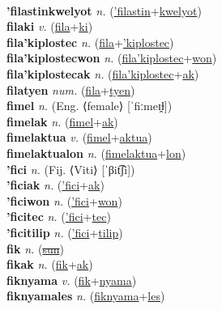  \label{'filastinwon} \\
\textbf{'filastinkwelyot} \textit{n.} (\hyperref['filastin]{'filastin}+\hyperref[kwelyot]{kwelyot})
 \label{'filastinkwelyot} \\
\textbf{filaki} \textit{v.} (\hyperref[fila]{fila}+\hyperref[ki]{ki})
 \label{filaki} \\
\textbf{fila'kiplostec} \textit{n.} (\hyperref[fila]{fila}+\hyperref['kiplostec]{'kiplostec})
 \label{fila'kiplostec} \\
\textbf{fila'kiplostecwon} \textit{n.} (\hyperref[fila'kiplostec]{fila'kiplostec}+\hyperref[won]{won})
 \label{fila'kiplostecwon} \\
\textbf{fila'kiplostecak} \textit{n.} (\hyperref[fila'kiplostec]{fila'kiplostec}+\hyperref[ak]{ak})
 \label{fila'kiplostecak} \\
\textbf{filatyen} \textit{num.} (\hyperref[fila]{fila}+\hyperref[tyen]{tyen})
 \label{filatyen} \\
\textbf{fimel} \textit{n.} (Eng. ⟨female⟩ [ˈfiːmeɪ̯ɫ])
 \label{fimel} \\
\textbf{fimelak} \textit{n.} (\hyperref[fimel]{fimel}+\hyperref[ak]{ak})
 \label{fimelak} \\
\textbf{fimelaktua} \textit{v.} (\hyperref[fimel]{fimel}+\hyperref[aktua]{aktua})
 \label{fimelaktua} \\
\textbf{fimelaktualon} \textit{n.} (\hyperref[fimelaktua]{fimelaktua}+\hyperref[lon]{lon})
 \label{fimelaktualon} \\
\textbf{'fici} \textit{n.} (Fij. ⟨Viti⟩ [ˈβit͡ʃi])
 \label{'fici} \\
\textbf{'ficiak} \textit{n.} (\hyperref['fici]{'fici}+\hyperref[ak]{ak})
 \label{'ficiak} \\
\textbf{'ficiwon} \textit{n.} (\hyperref['fici]{'fici}+\hyperref[won]{won})
 \label{'ficiwon} \\
\textbf{'ficitec} \textit{n.} (\hyperref['fici]{'fici}+\hyperref[tec]{tec})
 \label{'ficitec} \\
\textbf{'ficitilip} \textit{n.} (\hyperref['fici]{'fici}+\hyperref[tilip]{tilip})
 \label{'ficitilip} \\
\textbf{fik} \textit{n.} (\hyperref[sun]{\sout{sun}})
 \label{fik} \\
\textbf{fikak} \textit{n.} (\hyperref[fik]{fik}+\hyperref[ak]{ak})
 \label{fikak} \\
\textbf{fiknyama} \textit{v.} (\hyperref[fik]{fik}+\hyperref[nyama]{nyama})
 \label{fiknyama} \\
\textbf{fiknyamales} \textit{n.} (\hyperref[fiknyama]{fiknyama}+\hyperref[les]{les})
